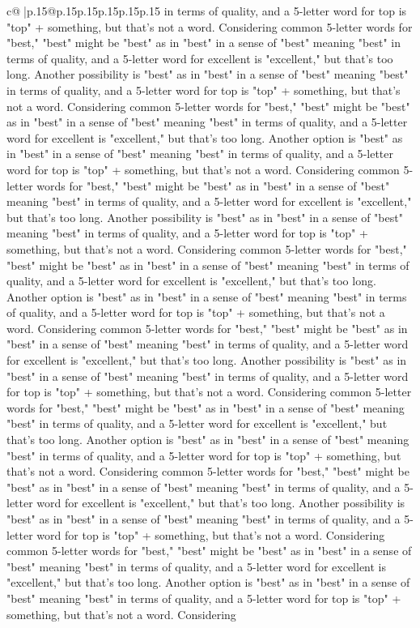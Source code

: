 \documentclass{article}
\begin{document}
{\begin{supertabular}{c@{$\;$}|p{.15\linewidth}@{}p{.15\linewidth}p{.15\linewidth}p{.15\linewidth}p{.15\linewidth}p{.15\linewidth}}
{{{in terms of quality, and a 5{-}letter word for top is "top" + something, but that's not a word. Considering common 5{-}letter words for "best," "best" might be "best" as in "best" in a sense of "best" meaning "best" in terms of quality, and a 5{-}letter word for excellent is "excellent," but that's too long. Another possibility is "best" as in "best" in a sense of "best" meaning "best" in terms of quality, and a 5{-}letter word for top is "top" + something, but that's not a word. Considering common 5{-}letter words for "best," "best" might be "best" as in "best" in a sense of "best" meaning "best" in terms of quality, and a 5{-}letter word for excellent is "excellent," but that's too long. Another option is "best" as in "best" in a sense of "best" meaning "best" in terms of quality, and a 5{-}letter word for top is "top" + something, but that's not a word. Considering common 5{-}letter words for "best," "best" might be "best" as in "best" in a sense of "best" meaning "best" in terms of quality, and a 5{-}letter word for excellent is "excellent," but that's too long. Another possibility is "best" as in "best" in a sense of "best" meaning "best" in terms of quality, and a 5{-}letter word for top is "top" + something, but that's not a word. Considering common 5{-}letter words for "best," "best" might be "best" as in "best" in a sense of "best" meaning "best" in terms of quality, and a 5{-}letter word for excellent is "excellent," but that's too long. Another option is "best" as in "best" in a sense of "best" meaning "best" in terms of quality, and a 5{-}letter word for top is "top" + something, but that's not a word. Considering common 5{-}letter words for "best," "best" might be "best" as in "best" in a sense of "best" meaning "best" in terms of quality, and a 5{-}letter word for excellent is "excellent," but that's too long. Another possibility is "best" as in "best" in a sense of "best" meaning "best" in terms of quality, and a 5{-}letter word for top is "top" + something, but that's not a word. Considering common 5{-}letter words for "best," "best" might be "best" as in "best" in a sense of "best" meaning "best" in terms of quality, and a 5{-}letter word for excellent is "excellent," but that's too long. Another option is "best" as in "best" in a sense of "best" meaning "best" in terms of quality, and a 5{-}letter word for top is "top" + something, but that's not a word. Considering common 5{-}letter words for "best," "best" might be "best" as in "best" in a sense of "best" meaning "best" in terms of quality, and a 5{-}letter word for excellent is "excellent," but that's too long. Another possibility is "best" as in "best" in a sense of "best" meaning "best" in terms of quality, and a 5{-}letter word for top is "top" + something, but that's not a word. Considering common 5{-}letter words for "best," "best" might be "best" as in "best" in a sense of "best" meaning "best" in terms of quality, and a 5{-}letter word for excellent is "excellent," but that's too long. Another option is "best" as in "best" in a sense of "best" meaning "best" in terms of quality, and a 5{-}letter word for top is "top" + something, but that's not a word. Considering }}}
\end{supertabular}}
\end{document}
